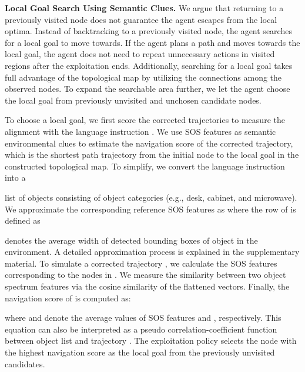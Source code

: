 \documentclass[10pt,twocolumn,letterpaper]{article}
\begin{document}
\noindent\textbf{Local Goal Search Using Semantic Clues.}\label{paragraph:local-goal-search-with-semantic-clues}
\font=2.3pt
We argue that returning to a previously visited node does not guarantee the agent escapes from the local optima. Instead of backtracking to a previously visited node, the agent searches for a local goal to move towards. If the agent plans a path and moves towards the local goal, the agent does not need to repeat unnecessary actions in visited regions after the exploitation ends. Additionally, searching for a local goal takes full advantage of the topological map by utilizing the connections among the observed nodes. To expand the searchable area further, we let the agent choose the local goal from previously unvisited and unchosen candidate nodes.
\font=2.5pt

To choose a local goal, we first score the corrected trajectories to measure the alignment with the language instruction . We use SOS features as semantic environmental clues to estimate the navigation score  of the corrected trajectory, which is the shortest path trajectory from the initial node to the local goal in the constructed topological map.\! To simplify, we convert the language instruction into a 

\noindent list of objects  consisting of  object categories (e.g., desk, cabinet, and microwave). We approximate the corresponding reference SOS features as  where the  row of  is defined as \font=2.5pt

\noindent denotes the average width of detected bounding boxes of object  in the environment. A detailed approximation process is explained in the supplementary material. To simulate a corrected trajectory , we calculate the SOS features  corresponding to the nodes in . We measure the similarity between two object spectrum features via the cosine similarity of the flattened vectors. Finally, the navigation score  of  is computed as:
{\footnotesize

}\vspace{-0.4cm}

\noindent where  and  denote the average values of SOS features  and , respectively. This equation can also be interpreted as a pseudo correlation-coefficient function between object list  and trajectory .
The exploitation policy selects the node with the highest navigation score as the local goal from the previously unvisited candidates.
\end{document}
